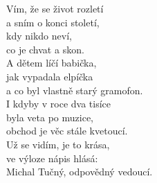 \cho{}

\ve{}
Vím, že se život rozletí\\
a sním o konci století,\\
kdy nikdo neví,\\
co je chvat a skon.\\
A dětem líčí babička,\\
jak vypadala elpíčka\\
a co byl vlastně starý gramofon.\\
I kdyby v roce dva tisíce\\
byla veta po muzice,\\
obchod je věc stále kvetoucí.\\
Už se vidím, je to krása,\\
ve výloze nápis hlásá:\\
Michal Tučný, odpovědný vedoucí.

\cho{}
\esong{}